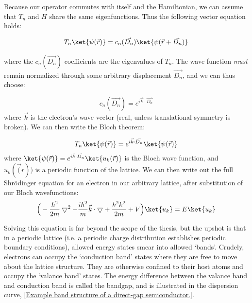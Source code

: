 Because our operator commutes with itself and the Hamiltonian, we can assume that $T_n$ and $H$ share the same eigenfunctions. Thus the following vector equation holds:

\begin{equation}
T_n\ket{\psi(\vec{r})} = c_n(\vec{D_n})\ket{\psi(\vec{r} + \vec{D_n})}
\end{equation}

where the $c_n(\vec{D_n})$ coefficients are the eigenvalues of $T_n$. The wave function \textit{must} remain normalized through some arbitrary displacement $\vec{D_n}$, and we can thus choose:

\begin{equation}
c_n(\vec{D_n}) = e^{i \vec{k} \cdot \vec{D_n}}
\end{equation}
where $\vec{k}$ is the electron's wave vector (real, unless translational symmetry is broken). We can then write the Bloch theorem:

\begin{equation}
T_n \ket{ \psi(\vec{r})} = e^{i\vec{k} \cdot \vec{D_n}} \ket{\psi(\vec{r})}
\end{equation}
where $\ket{\psi(\vec{r})} = e^{i\vec{k} \cdot \vec{D_n}}\ket{u_k(\vec{r})}$ is the Bloch wave function, and $u_k(\vec(r))$ is a periodic function of the lattice. We can then write out the full Shr\"{o}dinger equation for an electron in our arbitrary lattice, after substitution of our Bloch wavefunctions:
\begin{equation}
\Big (-\frac{ \hbar ^2}{2m} \bigtriangledown ^2 - \frac{ i\hbar^2}{m} \vec{k} \cdot \bigtriangledown + \frac{\hbar^2 k^2}{2m} + V \Big )\ket{u_k} = E \ket{u_k}
\end{equation}

\indent Solving this equation is far beyond the scope of the thesis, but the upshot is that in a periodic lattice (i.e. a periodic charge distribution establishes periodic boundary conditions), allowed energy states smear into allowed `bands'. Crudely, electrons can occupy the `conduction band' states where they are free to move about the lattice structure. They are otherwise confined to their host atoms and occupy the `valance band' states. The energy difference between the valance band and conduction band is called the bandgap, and is illustrated in the dispersion curve, \ref{Example band structure of a direct-gap semiconductor.}. 

